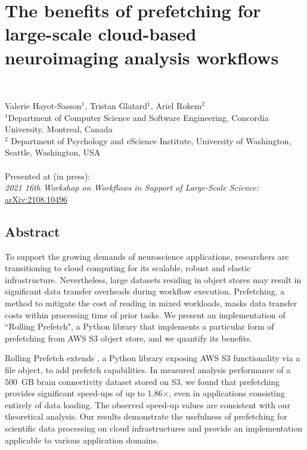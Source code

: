 \chapter{The benefits of prefetching for large-scale cloud-based neuroimaging analysis workflows}~\label{chp:rp}



Valerie Hayot-Sasson$^1$, Tristan Glatard$^1$, Ariel Rokem$^2$ \\
\begingroup \footnotesize
$^1$Department of Computer Science and Software Engineering, Concordia University, Montreal, Canada\\
$^2$ Department of Psychology and eScience Institute, University of Washington, Seattle, Washington, USA\\
\endgroup
\vspace{5pt} \\
Presented at (in press): \\
\hspace*{10pt} \textit{2021 16th Workshop on Workflows in Support of Large-Scale Science:} \url{arXiv:2108.10496}

\section{Abstract}
To support the growing demands of neuroscience applications, researchers are transitioning to cloud computing for its scalable, robust and elastic infrastructure. Nevertheless, large datasets residing in object stores may result in significant data transfer overheads during workflow execution.
Prefetching, a method to mitigate the cost of reading in mixed workloads, masks data transfer costs within processing time of prior tasks. We present an implementation of ``Rolling Prefetch", a Python library that implements a particular form of prefetching from AWS S3 object store, and we quantify its benefits.

Rolling Prefetch extends \sfs, a Python library exposing AWS S3 functionality via a file object, to add prefetch capabilities. 
In measured analysis performance of a 500~GB brain connectivity dataset stored on S3, we found that prefetching provides significant speed-ups of up to 1.86$\times$, even in applications consisting entirely of data loading. The observed speed-up values are consistent with our theoretical analysis. Our results demonstrate the usefulness of prefetching for scientific data processing on cloud infrastructures and provide an implementation applicable to various application domains.


